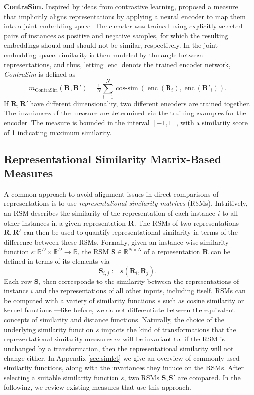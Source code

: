 \documentclass{article}
\newcommand{\citet}{\textcite}
\newcommand{\Real}{\mathbb{R}}
\newcommand{\R}{\bm{R}}
\newcommand{\Rp}{\bm{R'}}
\newcommand{\Sm}{\bm{S}}
\newcommand{\Smp}{\bm{S'}}
\newcommand{\subheader}{\textbf}
\begin{document}
\subheader{ContraSim.}
Inspired by ideas from contrastive learning, \citet{rahamim_contrasim_2024} proposed a measure that implicitly aligns representations by applying a neural encoder to map them into a joint embedding space.
The encoder was trained using explicitly selected pairs of instances as positive and negative samples, for which the resulting embeddings should and should not be similar, respectively.
In the joint embedding space, similarity is then modeled by the angle between representations, and thus, letting $\operatorname{enc}$ denote the trained encoder network, \emph{ContraSim} is defined as
\begin{equation}\label{eq:contrasim}
    m_{\operatorname{ContraSim}}(\R, \Rp) = \tfrac{1}{N} \textstyle\sum_{i=1}^N \operatorname{cos-sim}\left(\operatorname{enc}(\R_i), \operatorname{enc}(\Rp_i)\right).
\end{equation}
If $\R, \Rp$ have different dimensionality, two different encoders are trained together.
The invariances of the measure are determined via the training examples for the encoder.
The measure is bounded in the interval $[-1,1]$, with a similarity score of 1 indicating maximum similarity.


\subsection{Representational Similarity Matrix-Based Measures}\label{sec:rsm}


A common approach to avoid alignment issues in direct comparisons of representations is to use \emph{representational similarity matrices} (RSMs).
Intuitively, an RSM describes the similarity of the representation of each instance $i$ to all other instances in a given representation $\R$.
The RSMs of two representations $\R,\Rp$ can then be used to quantify representational similarity in terms of the difference between these RSMs.
Formally, given an instance-wise similarity function $s: \Real^D \times \Real^D \longrightarrow\Real$, the RSM $\Sm \in \Real^{N \times N}$ of a representation $\R$ can be defined in terms of its elements via
\begin{equation}\label{eq:rsm}
    \Sm_{i,j}:=s(\R_i, \R_j).
\end{equation}
Each row $\Sm_i$ then corresponds to the similarity between the representations of instance $i$ and the representations of all other inputs, including itself.
RSMs can be computed with a variety of similarity functions $s$ such as cosine similarity \cite{chen_graph-based_2021} or kernel functions \cite{kornblith_similarity_2019}---like before, we do not differentiate between the equivalent concepts of similarity and distance functions.
Naturally, the choice of the underlying similarity function $s$ impacts the kind of transformations that the representational similarity measures $m$ will be invariant to:
if the RSM is unchanged by a transformation, then the representational similarity will not change either.
In Appendix \ref{sec:simfct} we give an overview of commonly used similarity functions, along with the invariances they induce on the RSMs.
After selecting a suitable similarity function $s$, two RSMs $\Sm, \Smp$ are compared.
In the following, we review existing measures that use this approach.
\end{document}
